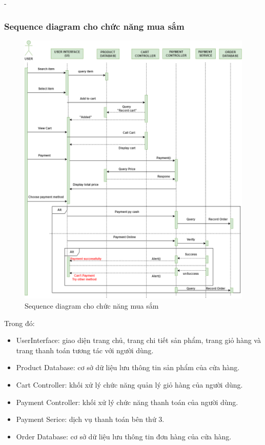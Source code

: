 \begin {list} {-}{}
\subsubsection{Sequence diagram cho chức năng mua sắm}
\begin{figure}[h]
    \centering
    \includegraphics[scale=0.5]{images/hieu/chap-3/shopping-sequence-diagram.png}
    \caption{Sequence diagram cho chức năng mua sắm}
\end{figure}
Trong đó:
\begin{itemize}
    \item UserInterface: giao diện trang chủ, trang chi tiết sản phẩm, trang giỏ hàng và trang thanh toán tương tác với người dùng.
    \item Product Database: cơ sở dữ liệu lưu thông tin sản phẩm của cửa hàng.
    \item Cart Controller: khối xử lý chức năng quản lý giỏ hàng của người dùng.
    \item Payment Controller: khối xử lý chức năng thanh toán của người dùng.
    \item Payment Serice: dịch vụ thanh toán bên thứ 3.
    \item Order Database: cơ sở dữ liệu lưu thông tin đơn hàng của cửa hàng.
\end{itemize}
\newpage

\end{list}
